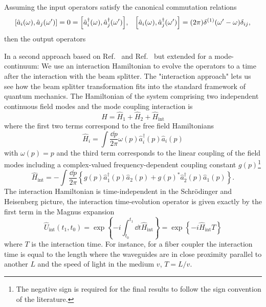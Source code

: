 Assuming the input operators satisfy the canonical commutation relations
\begin{align}
	\comm{\hat{a}_i(\omega)}{\hat{a}_j(\omega^\prime)}
	=
	0
	=
	\comm{\hat{a}_i^\dagger(\omega)}{\hat{a}_j^\dagger(\omega^\prime)}
	,
	&&
	\comm{\hat{a}_i(\omega)}{\hat{a}_j^\dagger(\omega^\prime)}
	=
	(2\pi)\delta^{(1)}(\omega^\prime-\omega)\delta_{ij},
\end{align}
then the output operators

In a second approach based on Ref.~\cite[p.~131]{Haroche2006} and Ref.~\cite[p.~17]{QuesadaMejia2015} but extended for a mode-continuum:
We use an interaction Hamiltonian to evolve the operators to a time after the interaction with the beam splitter.
The "interaction approach" lets us see how the beam splitter transformation fits into the standard framework of quantum mechanics.
The Hamiltonian of the system comprising two independent continuous field modes and the mode coupling interaction is
\begin{equation}
	\hat{H}
	=
	\hat{H}_1
	+
	\hat{H}_2
	+
	\hat{H}_\text{int}
\end{equation}
where the first two terms correspond to the free field Hamiltonians
\begin{equation}
	\hat{H}_i
	=
	\int\frac{\dd{p}}{2\pi}
	\omega(p)
	\hat{a}_i^\dagger(p)
	\hat{a}_i(p)
\end{equation}
with $\omega(p)=p$ and the third term corresponds to the linear coupling of the field modes including a complex-valued frequency-dependent coupling constant $g(p)$\footnote{The negative sign is required for the final results to follow the sign convention of the literature.}
\begin{equation}
	\hat{H}_\text{int}
	=
	-
	\int\frac{\dd{p}}{2\pi}
	\left\{
		g(p)
		\hat{a}_1^\dagger(p)
		\hat{a}_2(p)
		+
		g(p)^*
		\hat{a}_2^\dagger(p)
		\hat{a}_1(p)
	\right\}
	.
\end{equation}
The interaction Hamiltonian is time-independent in the Schrödinger and Heisenberg picture, the interaction time-evolution operator is given exactly by the first term in the Magnus expansion
\begin{equation}
	\hat{U}_\text{int}(t_1,t_0)
	=
	\exp\left\{
		-i\int_{t_0}^{t_1}\dd{t}
		\hat{H}_\text{int}
	\right\}
	=
	\exp\left\{
		-i
		\hat{H}_\text{int}
		T
	\right\}
\end{equation}
where $T$ is the interaction time.
For instance, for a fiber coupler the interaction time is equal to the length where the waveguides are in close proximity parallel to another $L$ and the speed of light in the medium $v$, $T=L/v$.
